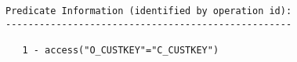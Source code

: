\documentclass[11pt,a4paper,parskip=half]{scrartcl}
\begin{document}
\begin{lstlisting}
Predicate Information (identified by operation id):                                                                                                                                                                                                                                                          
---------------------------------------------------                                                                                                                                                                                                                                                          
                                                                                                                                                                                                                                                                                                             
   1 - access("O_CUSTKEY"="C_CUSTKEY")                                                                                                                                                                                                                                                                       
\end{lstlisting}
\end{document}
